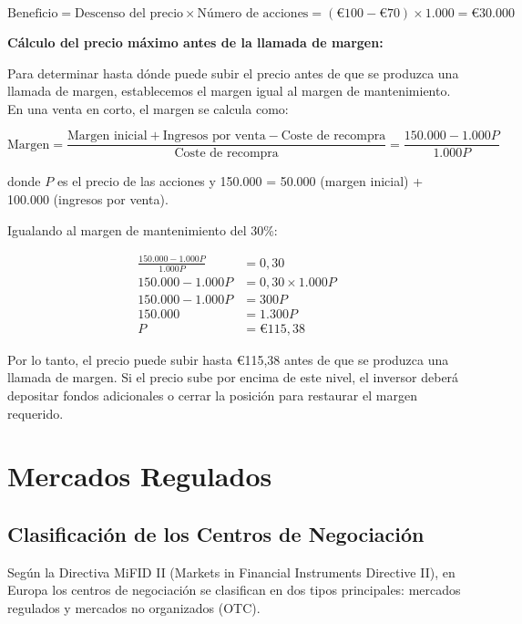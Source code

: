 \begin{ejemplo}
\begin{equation}
\text{Beneficio} = \text{Descenso del precio} \times \text{Número de acciones} = (€100 - €70) \times 1.000 = €30.000
\end{equation}

\textbf{Cálculo del precio máximo antes de la llamada de margen:}

Para determinar hasta dónde puede subir el precio antes de que se produzca una llamada de margen, establecemos el margen igual al margen de mantenimiento. En una venta en corto, el margen se calcula como:

\begin{equation}
\text{Margen} = \frac{\text{Margen inicial} + \text{Ingresos por venta} - \text{Coste de recompra}}{\text{Coste de recompra}} = \frac{150.000 - 1.000P}{1.000P}
\end{equation}

donde $P$ es el precio de las acciones y 150.000 = 50.000 (margen inicial) + 100.000 (ingresos por venta).

Igualando al margen de mantenimiento del 30\%:

\begin{align}
\frac{150.000 - 1.000P}{1.000P} &= 0,30 \\
150.000 - 1.000P &= 0,30 \times 1.000P \\
150.000 - 1.000P &= 300P \\
150.000 &= 1.300P \\
P &= €115,38
\end{align}

Por lo tanto, el precio puede subir hasta €115,38 antes de que se produzca una llamada de margen. Si el precio sube por encima de este nivel, el inversor deberá depositar fondos adicionales o cerrar la posición para restaurar el margen requerido.
\end{ejemplo}

\section{Mercados Regulados}

\subsection{Clasificación de los Centros de Negociación}

Según la Directiva MiFID II (Markets in Financial Instruments Directive II), en Europa los centros de negociación se clasifican en dos tipos principales: mercados regulados y mercados no organizados (OTC).

